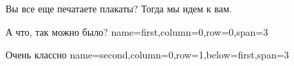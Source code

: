 \begin{myposter}{
    Вы все еще печатаете плакаты? Тогда мы идем к вам.
}

    \headerbox
    {А что, так можно было?}
    {name=first,column=0,row=0,span=3}
    {
        {\huge\bf
            \vspace{10pt}
            
            \vspace{10pt}
        }
    }
    
    \headerbox
    {Очень классно}
    {name=second,column=0,row=1,below=first,span=3}
    {
        {\huge\bf
            \vspace{10pt}
            
            \vspace{10pt}
        }
    }
    
\end{myposter}
